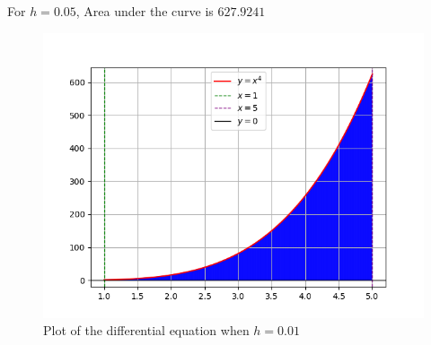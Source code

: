 \documentclass[journal]{IEEEtran}
\begin{document}
For $h = 0.05$, Area under the curve is $627.9241$

\begin{figure}[ht]
    \centering
    \includegraphics[width=\columnwidth]{figs/plot.png}
    \caption{Plot of the differential equation when $h=0.01$}
    \label{fig:Plot1}
    \end{figure}
\end{document}
